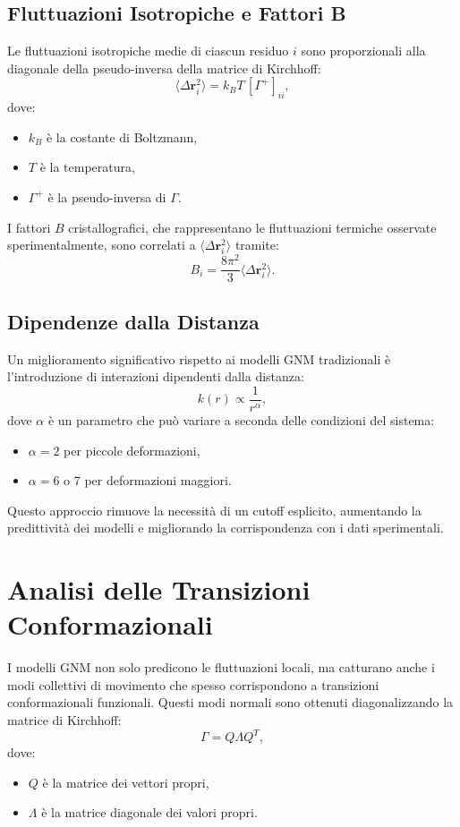 \documentclass[Lau,binding=0.6cm,oneside,noexaminfo]{sapthesis}
\begin{document}
\subsection{Fluttuazioni Isotropiche e Fattori B}
Le fluttuazioni isotropiche medie di ciascun residuo \(i\) sono proporzionali alla diagonale della pseudo-inversa della matrice di Kirchhoff:
\begin{equation}
    \langle \Delta \mathbf{r}_i^2 \rangle = k_B T \, [\Gamma^+]_{ii},
\end{equation}
dove:
\begin{itemize}
    \item \(k_B\) è la costante di Boltzmann,
    \item \(T\) è la temperatura,
    \item \(\Gamma^+\) è la pseudo-inversa di \(\Gamma\).
\end{itemize}

I fattori \(B\) cristallografici, che rappresentano le fluttuazioni termiche osservate sperimentalmente, sono correlati a \(\langle \Delta \mathbf{r}_i^2 \rangle\) tramite:
\begin{equation}
    B_i = \frac{8\pi^2}{3} \langle \Delta \mathbf{r}_i^2 \rangle.
\end{equation}

\subsection{Dipendenze dalla Distanza}
Un miglioramento significativo rispetto ai modelli GNM tradizionali è l'introduzione di interazioni dipendenti dalla distanza:
\begin{equation}
    k(r) \propto \frac{1}{r^\alpha},
\end{equation}
dove \(\alpha\) è un parametro che può variare a seconda delle condizioni del sistema:
\begin{itemize}
    \item \(\alpha = 2\) per piccole deformazioni,
    \item \(\alpha = 6\) o \(7\) per deformazioni maggiori.
\end{itemize}
Questo approccio rimuove la necessità di un cutoff esplicito, aumentando la predittività dei modelli e migliorando la corrispondenza con i dati sperimentali.

\section{Analisi delle Transizioni Conformazionali}
I modelli GNM non solo predicono le fluttuazioni locali, ma catturano anche i modi collettivi di movimento che spesso corrispondono a transizioni conformazionali funzionali. Questi modi normali sono ottenuti diagonalizzando la matrice di Kirchhoff:
\begin{equation}
    \Gamma = Q \Lambda Q^T,
\end{equation}
dove:
\begin{itemize}
    \item \(Q\) è la matrice dei vettori propri,
    \item \(\Lambda\) è la matrice diagonale dei valori propri.
\end{itemize}
\end{document}
